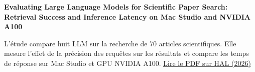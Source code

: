 
\begin{cvparagraph}
\noindent\textbf{Evaluating Large Language Models for Scientific Paper Search: Retrieval Success and Inference Latency on Mac Studio and NVIDIA A100}\par
\vspace{1.5pt}
\noindent L’étude compare huit LLM sur la recherche de 70 articles scientifiques. Elle mesure l’effet de la précision des requêtes sur les résultats et compare les temps de réponse sur Mac Studio et GPU NVIDIA A100.
\enspace\href{https://hal.science/hal-05862398/document}{\underline{Lire le PDF sur HAL (2026)}}
\end{cvparagraph}
